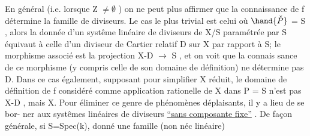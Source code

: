 En général (i.e.  lorsque Z $\neq \emptyset$ ) on ne peut plus affirmer que
la connaissance de f détermine la famille de diviseurs. Le cas le plus
trivial est celui où $\hand{\check{P}}$ = S , alors la donnée d'un systême linéaire de
diviseurs de X/S paramétrée par S équivaut à celle d'un diviseur de
Cartier relatif D sur X par rapport à S;  le morphisme
associé est la projection X-D $\longrightarrow$ S , et on voit  que la connais
sance de ce morphisme (y compris celle de son domaine de définition)
ne détermine pas D. Dans ce cas également, supposant pour simplifier X
réduit, le domaine de définition de  f  considéré
comme application rationelle de X dans P = S n'est pas X-D , mais X.
Pour éliminer ce genre de phénomènes déplaisants, il y a lieu de se bor-%
ner aux systêmes linéaires de diviseurs \uline{``sans composante fixe''} . De
façon générale, si S=Spec(k),  donné une famille (non néc linéaire)

